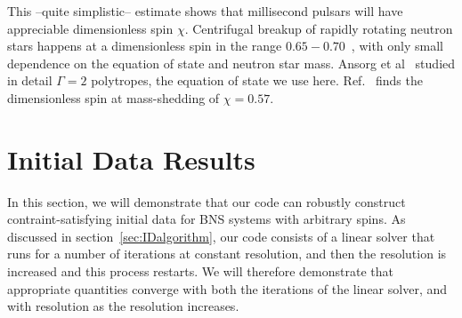 \documentclass[aps,prd,amsmath,floatfix
,twocolumn
,superscriptaddress,nofootinbib,showpacs]{revtex4-1}
\theoremstyle{plain} \newtheorem{thm}{Theorem} \newtheorem{lem}{Lemma}
\begin{document}
This --quite simplistic-- estimate shows that millisecond pulsars will
have appreciable dimensionless spin $\chi$.  Centrifugal breakup of
rapidly rotating neutron stars happens at a dimensionless spin in the
range $0.65-0.70$~\cite{Lo:2010bj}, with only small dependence on the
equation of state and neutron star mass.  Ansorg et
al~\cite{Ansorg:2003br} studied in detail $\Gamma = 2$ polytropes, the
equation of state we use here.  Ref.~\cite{Ansorg:2003br} finds the
dimensionless spin at mass-shedding of $\chi=0.57$.

\section{Initial Data Results}
\label{sec:ID}


In this section, we will demonstrate that our code can robustly
construct contraint-satisfying initial data for BNS systems with
arbitrary spins. As discussed in section~\ref{sec:IDalgorithm}, our code consists of a
linear solver that runs for a number of iterations at constant
resolution, and then the resolution is increased and this process
restarts. We will therefore demonstrate that appropriate quantities
converge with both the iterations of the linear solver, and with
resolution as the resolution increases. 
\end{document}
